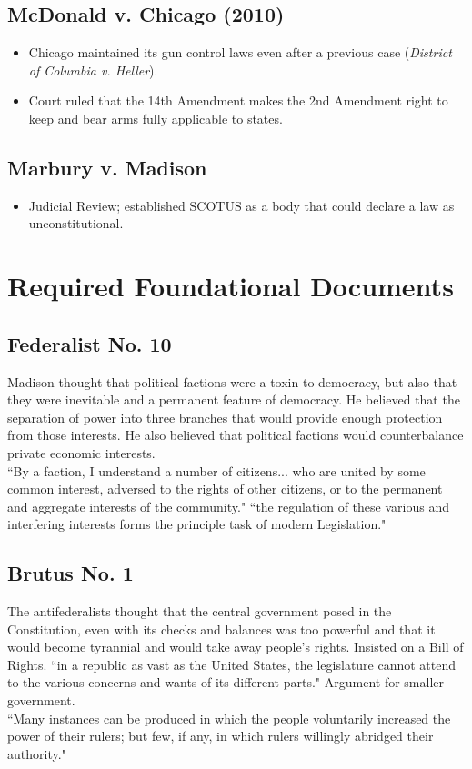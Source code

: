 \documentclass[12pt]{article}
\begin{document}
\hypertarget{McDonald}{\subsection*{McDonald v. Chicago (2010)}}
	\begin{itemize}
		\item Chicago maintained its gun control laws even after a previous case (\textit{District of Columbia v. Heller}).
		\item Court ruled that the 14th Amendment makes the 2nd Amendment right to keep and bear arms fully applicable to states.
	\end{itemize}
\hypertarget{Marbury}{\subsection*{Marbury v. Madison}}
	\begin{itemize}
		\item Judicial Review; established SCOTUS as a body that could declare a law as unconstitutional.
	\end{itemize}
\section*{Required Foundational Documents}
\subsection*{Federalist No. 10}
	Madison thought that political factions were a toxin to democracy, but also that they were inevitable and a permanent feature of democracy. He believed that the separation of power into three branches that would provide enough protection from those interests. He also believed that political factions would counterbalance private economic interests.\\
``By a faction, I understand a number of citizens... who are united by some common interest, adversed to the rights of other citizens, or to the permanent and aggregate interests of the community." ``the regulation of these various and interfering interests forms the principle task of modern Legislation."\\

\subsection*{Brutus No. 1}
	The antifederalists thought that the central government posed in the Constitution, even with its checks and balances was too powerful and that it would become tyrannial and would take away people's rights. Insisted on a Bill of Rights. 
	``in a republic as vast as the United States, the legislature cannot attend to the various concerns and wants of its different parts." Argument for smaller government.\\
``Many instances can be produced in which the people voluntarily increased the power of their rulers; but few, if any, in which rulers willingly abridged their authority."\\
\end{document}
